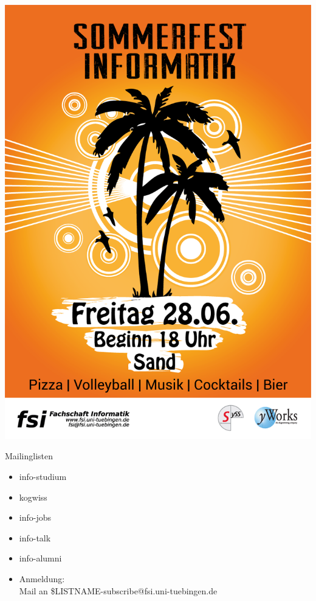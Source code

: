 \documentclass{beamer}
\begin{document}
	{
	\begin{frame}
		\begin{center}
			\includegraphics[height=.95\paperheight]{sf13.png}
		\end{center}
	\end{frame}
	}

	\begin{frame}[<+->]{Mailinglisten}
		\begin{itemize}
			\item info-studium
			\item kogwiss
			\item info-jobs
			\item info-talk
			\item info-alumni
			\item Anmeldung:\\
				Mail an \$LISTNAME-subscribe@fsi.uni-tuebingen.de 
		\end{itemize}
	\end{frame}
\end{document}
